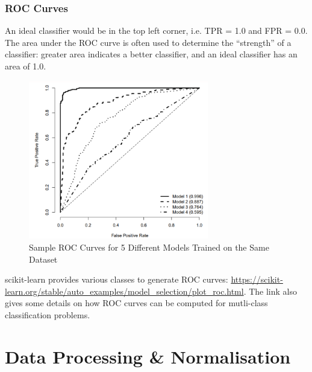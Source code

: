 \documentclass[a4paper,11pt]{article}
\begin{document}
\subsubsection{ROC Curves}
An ideal classifier would be in the top left corner, i.e. TPR = 1.0 and FPR = 0.0.
The area under the ROC curve is often used to determine the ``strength'' of a classifier: greater area indicates a better classifier, and an ideal classifier has an area of 1.0.

\begin{figure}[H]
    \centering
    \includegraphics[width=0.7\textwidth]{images/sampleroc.png}
    \caption{Sample ROC Curves for 5 Different Models Trained on the Same Dataset}
\end{figure}

scikit-learn provides various classes to generate ROC curves: \url{https://scikit-learn.org/stable/auto_examples/model_selection/plot_roc.html}.
The link also gives some details on how ROC curves can be computed for mutli-class classification problems.

\section{Data Processing \& Normalisation}
\end{document}
